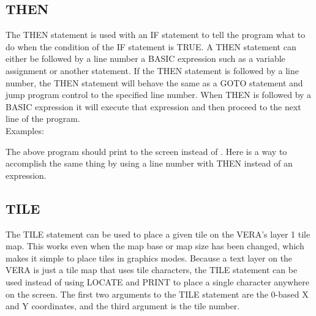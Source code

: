 \subsection{THEN}

The {\ttfamily THEN} statement is used with an {\ttfamily IF} statement to tell
the program what to do when the condition of the {\ttfamily IF} statement is
{\ttfamily TRUE}.  A {\ttfamily THEN} statement can either be followed by a
line number a BASIC expression such as a variable assignment or another
statement.  If the {\ttfamily THEN} statement is followed by a line number, the
{\ttfamily THEN} statement will behave the same as a {\ttfamily GOTO} statement
and jump program control to the specified line number.  When {\ttfamily THEN}
is followed by a BASIC expression it will execute that expression and then
proceed to the next line of the program.\\

Examples:\\


The above program should print {} to the screen instead of
{}.  Here is a way to accomplish the same thing by using a line
number with {\ttfamily THEN} instead of an expression.\\


\subsection{TILE}

The {\ttfamily TILE} statement can be used to place a given tile on the VERA's
layer 1 tile map.  This works even when the map base or map size has been
changed, which makes it simple to place tiles in graphics modes.  Because a
text layer on the VERA is just a tile map that uses tile characters, the
{\ttfamily TILE} statement can be used instead of using {\ttfamily LOCATE} and
{\ttfamily PRINT} to place a single character anywhere on the screen.  The
first two arguments to the {\ttfamily TILE} statement are the 0-based X and Y
coordinates, and the third argument is the tile number.\\

